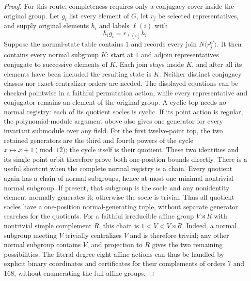 \begin{proof}
For this route, completeness requires only a conjugacy cover inside the
original group. Let $g_i$ list every element of $G$, let $r_j$ be selected
representatives, and supply original elements $h_i$ and labels $\ell(i)$
with
\[
 h_i g_i=r_{\ell(i)}h_i.
\]
Suppose the normal-state table contains $1$ and records every join
$N\langle r_j^G\rangle$. It then contains every normal subgroup $K$:
start at $1$ and adjoin representatives conjugate to successive elements
of $K$. Each join stays inside $K$, and after all its elements have been
included the resulting state is $K$. Neither distinct conjugacy classes
nor exact centralizer orders are needed. The displayed equations can be
checked pointwise in a faithful permutation action, while every
representative and conjugator remains an element of the original group.
A cyclic top needs no normal registry: each of its quotient socles is
cyclic. If its point action is regular, the polynomial-module argument
above also gives one generator for every invariant submodule over any
field. For the first twelve-point top, the two retained generators are
the third and fourth powers of the cycle $x\mapsto x+1\pmod {12}$;
the cycle itself is their quotient. These two identities and its single
point orbit therefore prove both one-position bounds directly.
There is a useful shortcut when the complete normal registry is a chain.
Every quotient again has a chain of normal subgroups, hence at most one
minimal nontrivial normal subgroup. If present, that subgroup is the socle
and any nonidentity element normally generates it; otherwise the socle is
trivial. Thus all quotient socles have a one-position normal-generating
tuple, without separate generator searches for the quotients.
For a faithful irreducible affine group $V\rtimes R$ with nontrivial simple
complement $R$, this chain is $1<V<V\rtimes R$. Indeed, a normal subgroup
meeting $V$ trivially centralizes $V$ and is therefore trivial; any other
normal subgroup contains $V$, and projection to $R$ gives the two remaining
possibilities. The literal degree-eight affine actions can thus be handled
by explicit binary coordinates and certificates for their complements of
orders $7$ and $168$, without enumerating the full affine groups.


\end{proof}
